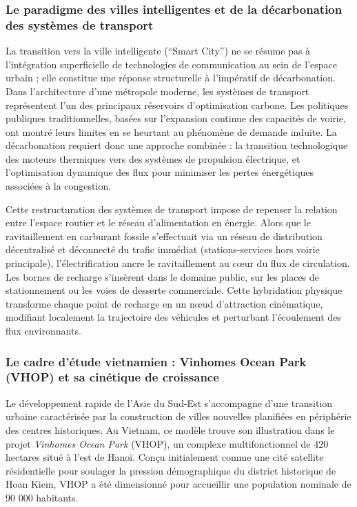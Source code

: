 \documentclass[10pt, a4paper]{article}
\begin{document}
\subsubsection{Le paradigme des villes intelligentes et de la
décarbonation des systèmes de
transport}\label{le-paradigme-des-villes-intelligentes-et-de-la-duxe9carbonation-des-systuxe8mes-de-transport}

La transition vers la ville intelligente (``Smart City'') ne se résume
pas à l'intégration superficielle de technologies de communication au
sein de l'espace urbain ; elle constitue une réponse structurelle à
l'impératif de décarbonation. Dans l'architecture d'une métropole
moderne, les systèmes de transport représentent l'un des principaux
réservoirs d'optimisation carbone. Les politiques publiques
traditionnelles, basées sur l'expansion continue des capacités de
voirie, ont montré leurs limites en se heurtant au phénomène de demande
induite. La décarbonation requiert donc une approche combinée : la
transition technologique des moteurs thermiques vers des systèmes de
propulsion électrique, et l'optimisation dynamique des flux pour
minimiser les pertes énergétiques associées à la congestion.

Cette restructuration des systèmes de transport impose de repenser la
relation entre l'espace routier et le réseau d'alimentation en énergie.
Alors que le ravitaillement en carburant fossile s'effectuait via un
réseau de distribution décentralisé et déconnecté du trafic immédiat
(stations-services hors voirie principale), l'électrification ancre le
ravitaillement au cœur du flux de circulation. Les bornes de recharge
s'insèrent dans le domaine public, sur les places de stationnement ou
les voies de desserte commerciale. Cette hybridation physique transforme
chaque point de recharge en un nœud d'attraction cinématique, modifiant
localement la trajectoire des véhicules et perturbant l'écoulement des
flux environnants.

\subsubsection{Le cadre d'étude vietnamien : Vinhomes Ocean Park (VHOP)
et sa cinétique de
croissance}\label{le-cadre-duxe9tude-vietnamien-vinhomes-ocean-park-vhop-et-sa-cinuxe9tique-de-croissance}

Le développement rapide de l'Asie du Sud-Est s'accompagne d'une
transition urbaine caractérisée par la construction de villes nouvelles
planifiées en périphérie des centres historiques. Au Vietnam, ce modèle
trouve son illustration dans le projet \emph{Vinhomes Ocean Park}
(VHOP), un complexe multifonctionnel de 420 hectares situé à l'est de
Hanoï. Conçu initialement comme une cité satellite résidentielle pour
soulager la pression démographique du district historique de Hoan Kiem,
VHOP a été dimensionné pour accueillir une population nominale de 90 000
habitants.
\end{document}
